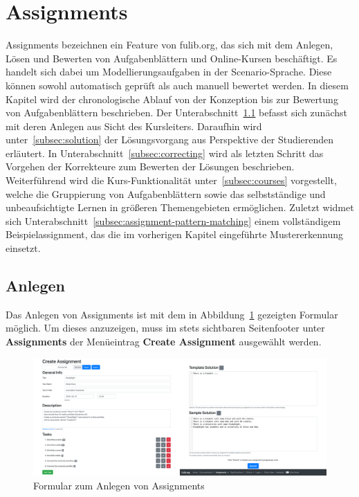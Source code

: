 \section{Assignments}\label{sec:assignments}

Assignments bezeichnen ein Feature von fulib.org, das sich mit dem Anlegen, Lösen und Bewerten von Aufgabenblättern und Online-Kursen beschäftigt.
Es handelt sich dabei um Modellierungsaufgaben in der Scenario-Sprache.
Diese können sowohl automatisch geprüft als auch manuell bewertet werden.
In diesem Kapitel wird der chronologische Ablauf von der Konzeption bis zur Bewertung von Aufgabenblättern beschrieben.
Der Unterabschnitt~\ref{subsec:creation} befasst sich zunächst mit deren Anlegen aus Sicht des Kursleiters.
Daraufhin wird unter~\ref{subsec:solution} der Lösungsvorgang aus Perspektive der Studierenden erläutert.
In Unterabschnitt~\ref{subsec:correcting} wird als letzten Schritt das Vorgehen der Korrekteure zum Bewerten der Lösungen beschrieben.
Weiterführend wird die Kurs-Funktionalität unter~\ref{subsec:courses} vorgestellt, welche die Gruppierung von Aufgabenblättern sowie das selbstständige und unbeaufsichtigte Lernen in größeren Themengebieten ermöglichen.
Zuletzt widmet sich Unterabschnitt~\ref{subsec:assignment-pattern-matching} einem vollständigem Beispielassignment, das die im vorherigen Kapitel eingeführte Mustererkennung einsetzt.

\subsection{Anlegen}\label{subsec:creation}

Das Anlegen von Assignments ist mit dem in Abbildung~\ref{fig:create-assignment} gezeigten Formular möglich.
Um dieses anzuzeigen, muss im stets sichtbaren Seitenfooter unter \textbf{Assignments} der Menüeintrag \textbf{Create Assignment} ausgewählt werden.

\begin{figure}
    \centering
    \includegraphics[width=\textwidth]{chapter/fulib.org/img/create-assignment.png}
    \caption{Formular zum Anlegen von Assignments}
    \label{fig:create-assignment}
\end{figure}

